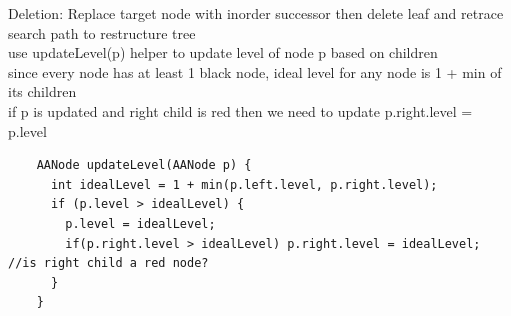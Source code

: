 \documentclass{article}
\begin{document}
  Deletion: Replace target node with inorder successor then delete leaf and retrace search path to restructure tree \\
  \indent use updateLevel(p) helper to update level of node p based on children \\
  \indent \indent since every node has at least 1 black node, ideal level for any node is 1 + min of its children \\
  \indent \indent if p is updated and right child is red then we need to update p.right.level = p.level\\ 
  \begin{lstlisting}
    AANode updateLevel(AANode p) {
      int idealLevel = 1 + min(p.left.level, p.right.level);
      if (p.level > idealLevel) {
        p.level = idealLevel;
        if(p.right.level > idealLevel) p.right.level = idealLevel;  //is right child a red node?
      }
    } 
  \end{lstlisting}
\end{document}
